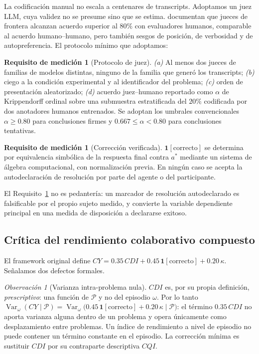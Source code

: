 \documentclass[11pt,a4paper]{article}
\theoremstyle{definition}
\newtheorem{requisito}[definicion]{Requisito de medición}
\theoremstyle{plain}
\theoremstyle{remark}
\newtheorem{observacion}[definicion]{Observación}
\DeclareMathOperator{\Var}{Var}
\newcommand{\ind}[1]{\mathbf{1}\!\left[#1\right]}
\begin{document}
La codificación manual no escala a centenares de transcripts. Adoptamos un juez
LLM, cuya validez no se presume sino que se estima. \citet{zheng2023judging}
documentan que jueces de frontera alcanzan acuerdo superior al $80\%$ con
evaluadores humanos, comparable al acuerdo humano--humano, pero también sesgos de
posición, de verbosidad y de autopreferencia. El protocolo mínimo que adoptamos:

\begin{requisito}[Protocolo de juez]\label{req:juez}
\emph{(a)} Al menos dos jueces de familias de modelos distintas, ninguno de la
familia que generó los transcripts;
\emph{(b)} ciego a la condición experimental y al identificador del problema;
\emph{(c)} orden de presentación aleatorizado;
\emph{(d)} acuerdo juez--humano reportado como $\alpha$ de Krippendorff ordinal
\citep{krippendorff2018content} sobre una submuestra estratificada del $20\%$
codificada por dos anotadores humanos entrenados. Se adoptan los umbrales
convencionales $\alpha\ge0.80$ para conclusiones firmes y
$0.667\le\alpha<0.80$ para conclusiones tentativas.
\end{requisito}

\begin{requisito}[Corrección verificada]\label{req:correccion}
$\ind{\text{correcto}}$ se determina por equivalencia simbólica de la respuesta
final contra $a^\ast$ mediante un sistema de álgebra computacional, con
normalización previa. En ningún caso se acepta la autodeclaración de resolución
por parte del agente o del participante.
\end{requisito}

El Requisito~\ref{req:correccion} no es pedantería: un marcador de resolución
autodeclarado es falsificable por el propio sujeto medido, y convierte la variable
dependiente principal en una medida de disposición a declararse exitoso.

\subsection{Crítica del rendimiento colaborativo compuesto}\label{sec:cy}

El framework original define
$CY = 0.35\,CDI + 0.45\,\ind{\text{correcto}} + 0.20\,\kappa$. Señalamos dos
defectos formales.

\begin{observacion}[Varianza intra-problema nula]
$CDI$ es, por su propia definición, \emph{prescriptivo}: una función de
$\mathcal{P}$ y no del episodio $\omega$. Por lo tanto
$\Var_\omega(CY\mid\mathcal{P}) = \Var_\omega\big(0.45\,\ind{\text{correcto}}
+0.20\,\kappa \mid \mathcal{P}\big)$: el término $0.35\,CDI$ no aporta varianza
alguna dentro de un problema y opera únicamente como desplazamiento entre
problemas. Un índice de rendimiento a nivel de episodio no puede contener un
término constante en el episodio. La corrección mínima es sustituir $CDI$ por su
contraparte descriptiva $CQI$.
\end{observacion}
\end{document}
